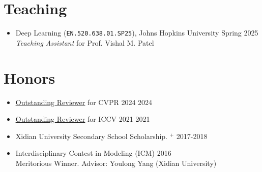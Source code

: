 \documentclass[10pt,margin,line,pifont,palatino,courier]{res}
\begin{document}
\begin{resume}
\section{\sc Teaching}

\begin{itemize}[leftmargin=*]
    \item Deep Learning (\verb|EN.520.638.01.SP25|), Johns Hopkins University \hfill Spring 2025\\
        \textit{Teaching Assistant} for Prof. Vishal M. Patel
\end{itemize}

%
%
%

\section{\sc Honors}

\begin{itemize}[leftmargin=*]
    \item \href{https://cvpr.thecvf.com/Conferences/2024/ProgramCommittee}{\underline{Outstanding Reviewer}} for CVPR 2024 \hfill 2024
    \item \href{http://iccv2021.thecvf.com/outstanding-reviewers}{\underline{Outstanding Reviewer}} for ICCV 2021 \hfill 2021
    \item Xidian University Secondary School Scholarship.%
        \href{https://web.archive.org/web/20181110035026/https://see.xidian.edu.cn/html/news/9732.html}{$^+$} \hfill 2017-2018
    \item Interdisciplinary Contest in Modeling (ICM) \hfill 2016\\
        {\small Meritorious Winner. Advisor: Youlong Yang (Xidian University)}
\end{itemize}



\end{resume}
\end{document}
